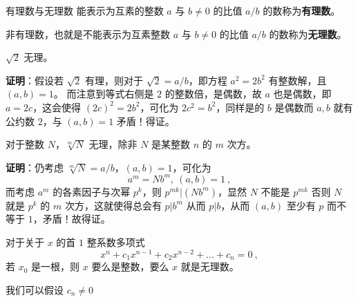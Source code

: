 
\begin{definition}{有理数与无理数}
能表示为互素的整数 $a$ 与 $b\neq 0$ 的比值 $a/b$ 的数称为\textbf{有理数}。

非有理数，也就是不能表示为互素整数 $a$ 与 $b\neq 0$ 的比值 $a/b$ 的数称为\textbf{无理数}。
\end{definition}

\begin{theorem}{}
$\sqrt{2}$ 无理。
\end{theorem}
\textbf{证明}：假设若 $\sqrt 2$ 有理，则对于 $\sqrt 2 = a/b$，即方程 $a^2=2b^2$ 有整数解，且 $(a, b) = 1$。
而注意到等式右侧是 $2$ 的整数倍，是偶数，故 $a$ 也是偶数，即 $a=2c$，这会使得 $(2c)^2 = 2b^2$，可化为 $2c^2=b^2$，同样是的 $b$ 是偶数而 $a, b$ 就有公约数 $2$，与 $(a, b) = 1$ 矛盾！得证。

\begin{theorem}{}
对于整数 $N$，$\sqrt[m]{N}$ 无理，除非 $N$ 是某整数 $n$ 的 $m$ 次方。
\end{theorem}
\textbf{证明}：仍考虑 $\sqrt[m]{N} = a/b$，$(a, b) = 1$，可化为
\begin{equation}
a^m = N b^m, ~ (a, b) = 1 ~,
\end{equation}
而考虑 $a^m$ 的各素因子与次幂 $p^k$，则 $p^{mk} | (Nb^m)$，显然 $N$ 不能是 $p^{mk}$ 否则 $N$ 就是 $p^k$ 的 $m$ 次方，这就使得总会有 $p | b^m$ 从而 $p|b$，从而 $(a, b)$ 至少有 $p$ 而不等于 $1$，矛盾！故得证。

\begin{theorem}{}
对于关于 $x$ 的首 $1$ 整系数多项式
\begin{equation}
x^n + c_1 x^{n-1} + c_2 x^{n-2} + \dots + c_n = 0 ~,
\end{equation}
若 $x_0$ 是一根，则 $x$ 要么是整数，要么 $x$ 就是无理数。
\end{theorem}
我们可以假设 $c_n \neq 0$ 
